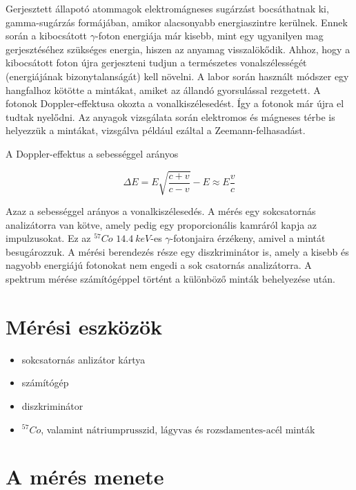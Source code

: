 \documentclass[a4paper,12pt]{article}
\begin{document}
\par Gerjesztett állapotó atommagok elektromágneses sugárzást bocsáthatnak ki, gamma-sugárzás formájában, amikor alacsonyabb energiaszintre kerülnek. Ennek során a kibocsátott $\gamma$-foton energiája már kisebb, mint egy ugyanilyen mag gerjesztéséhez szükséges energia, hiszen az anyamag visszalökődik. Ahhoz, hogy a kibocsátott foton újra gerjeszteni tudjun a természetes vonalszélességét (energiájának bizonytalanságát) kell növelni. A labor során használt módszer egy hangfalhoz kötötte a mintákat, amiket az állandó gyorsulással rezgetett. A fotonok Doppler-effektusa okozta a vonalkiszélesedést. Így a fotonok már újra el tudtak nyelődni. Az anyagok vizsgálata során elektromos és mágneses térbe is helyezzük a mintákat, vizsgálva például ezáltal a Zeemann-felhasadást.

\vspace{5mm}

\par A Doppler-effektus a sebességgel arányos

\begin{equation*}
	\Delta E = E\sqrt{\frac{c+v}{c-v}} - E \approx E\frac{v}{c}
\end{equation*}

\par Azaz a sebességgel arányos a vonalkiszélesedés. A mérés egy sokcsatornás analizátorra van kötve, amely pedig egy proporcionális kamráról kapja az impulzusokat. Ez az $^{57}Co$ $14.4~keV$-es $\gamma$-fotonjaira érzékeny, amivel a mintát besugározzuk. A mérési berendezés része egy diszkriminátor is, amely a kisebb és nagyobb energiájú fotonokat nem engedi a sok csatornás analizátorra. A spektrum mérése számítógéppel történt a különböző minták behelyezése után.

\section{Mérési eszközök}

\begin{itemize}
\item sokcsatornás anlizátor kártya
\item számítógép
\item diszkriminátor
\item $^{57}Co$, valamint $\text{nátriumprusszid}$,
$\text{lágyvas}$ és $\text{rozsdamentes-acél}$ minták
\end{itemize}

\section{A mérés menete}
\end{document}
